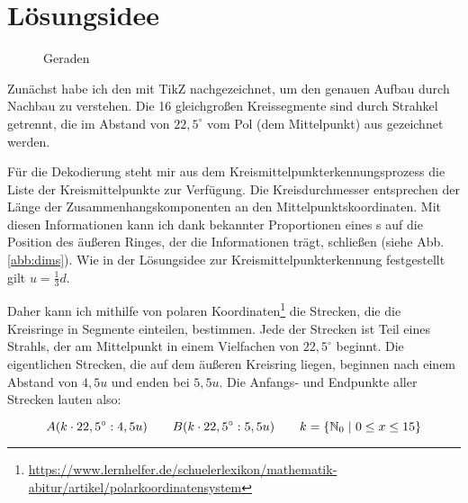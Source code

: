 \section{Lösungsidee}
	\begin{wrapfigure}{r}{0.35\textwidth}
		\setlength\intextsep{0pt}
		\centering
		
		\caption{Geraden}
		\label{abb:spidergrafik}
		\vspace{-20pt}
	\end{wrapfigure}
	Zunächst habe ich den \task{} mit TikZ nachgezeichnet, um den genauen Aufbau durch Nachbau zu verstehen. Die 16 gleichgroßen Kreissegmente sind durch Strahkel getrennt, die im Abstand von \(22,5^{\circ}\) vom Pol (dem Mittelpunkt) aus gezeichnet werden.

	Für die Dekodierung steht mir aus dem Kreismittelpunkterkennungsprozess die Liste der Kreismittelpunkte zur Verfügung. Die Kreisdurchmesser entsprechen der Länge der Zusammenhangskomponenten an den Mittelpunktskoordinaten. Mit diesen Informationen kann ich dank bekannter Proportionen eines \task{}s auf die Position des äußeren Ringes, der die Informationen trägt, schließen (siehe Abb. \ref{abb:dims}). Wie in der Lösungsidee zur Kreismittelpunkterkennung festgestellt gilt \(u=\frac{1}{3}d\).

	\begin{wrapfigure}{r}{0.25\textwidth}
		\setlength\intextsep{0pt}
		\centering	
		
		\caption{}
		\label{abb:trigon}
	\end{wrapfigure}
	Daher kann ich mithilfe von polaren Koordinaten\footnote{\url{https://www.lernhelfer.de/schuelerlexikon/mathematik-abitur/artikel/polarkoordinatensystem}} die Strecken, die die Kreisringe in Segmente einteilen, bestimmen. Jede der Strecken ist Teil eines Strahls, der am Mittelpunkt in einem Vielfachen von \(22,5^{\circ}\) beginnt. Die eigentlichen Strecken, die auf dem äußeren Kreisring liegen, beginnen nach einem Abstand von \(4,5u\) und enden bei \(5,5u\). Die Anfangs- und Endpunkte aller Strecken lauten also:

	\begin{displaymath}
	A(k \cdot 22,5^{\circ}:4,5u) \hspace{2em} B(k \cdot 22,5^{\circ}:5,5u) \hspace{2em} k = \{\mathbb{N}_0 \hspace{0.3em}|\hspace{0.3em} 0 \le x \le 15\}
	\end{displaymath}

